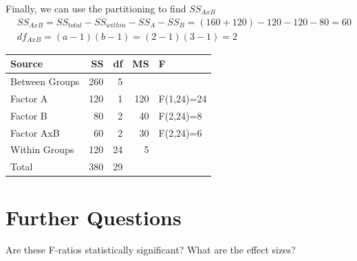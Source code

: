\documentclass{tufte-handout}
\begin{document}
Finally, we can use the partitioning to find $SS_{AxB}$
\begin{align*}
&SS_{AxB}=SS_{total}-SS_{within}-SS_A-SS_B=(160+120)-120-120-80=60\\
&df_{AxB} = (a-1)(b-1) = (2-1)(3-1)=2
\end{align*}

\begin{table}
  \centering
  \selectfont
  \begin{tabular}{lrrrl}
    \toprule
    Source &  SS &  df &  MS &  F \\
    \midrule
    Between Groups & 260 & 5 & & \\
    \qquad Factor A & 120 & 1 & 120 & F(1,24)=24 \\
    \qquad Factor B & 80 & 2 & 40 & F(2,24)=8 \\
    \qquad Factor AxB & 60 & 2 & 30 & F(2,24)=6 \\
    Within Groups & 120 & 24 & 5 & \\
    Total & 380 & 29  & & \\
    \bottomrule
  \end{tabular}
  \label{tab:normaltab}
\end{table}

\section{Further Questions}
Are these F-ratios statistically significant? What are the effect sizes?
\end{document}
